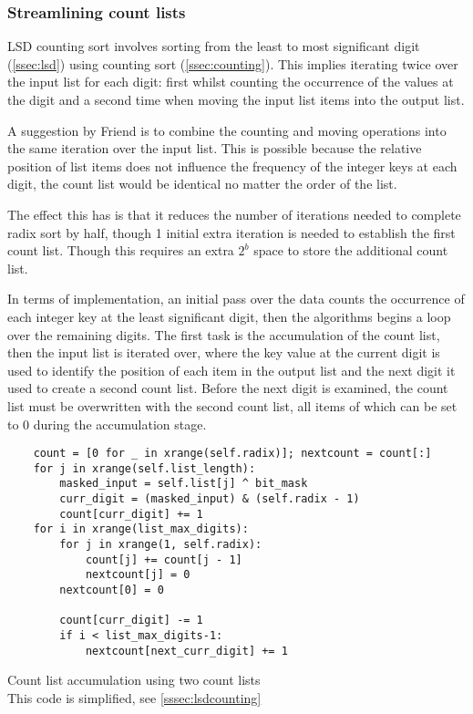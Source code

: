 \documentclass[12pt]{article}
\begin{document}
\subsubsection{Streamlining count lists}
\label{sssec:countlist}
LSD counting sort involves sorting from the least to most significant digit (\ref{ssec:lsd}) using counting sort (\ref{ssec:counting}). This implies iterating twice over the input list for each digit: first whilst counting the occurrence of the values at the digit and a second time when moving the input list items into the output list.
\par
A suggestion by Friend \cite{Friend} is to combine the counting and moving operations into the same iteration over the input list. This is possible because the relative position of list items does not influence the frequency of the integer keys at each digit, the count list would be identical no matter the order of the list.
\par
The effect this has is that it reduces the number of iterations needed to complete radix sort by half, though 1 initial extra iteration is needed to establish the first count list. Though this requires an extra $2^b$ space to store the additional count list.
\par 
In terms of implementation, an initial pass over the data counts the occurrence of each integer key at the least significant digit, then the algorithms begins a loop over the remaining digits. The first task is the accumulation of the count list, then the input list is iterated over, where the key value at the current digit is used to identify the position of each item in the output list and the next digit it used to create a second count list. Before the next digit is examined, the count list must be overwritten with the second count list, all items of which can be set to 0 during the accumulation stage.
\begin{table}[H]
	\centering
\begin{lstlisting}
	count = [0 for _ in xrange(self.radix)]; nextcount = count[:]
	for j in xrange(self.list_length):
		masked_input = self.list[j] ^ bit_mask
		curr_digit = (masked_input) & (self.radix - 1)
		count[curr_digit] += 1
	for i in xrange(list_max_digits):
		for j in xrange(1, self.radix):                    
			count[j] += count[j - 1]
			nextcount[j] = 0
		nextcount[0] = 0

		count[curr_digit] -= 1
		if i < list_max_digits-1:
			nextcount[next_curr_digit] += 1
\end{lstlisting}
\caption*{Count list accumulation using two count lists \\ This code is simplified, see \ref{sssec:lsdcounting}}
\end{table}
\end{document}
